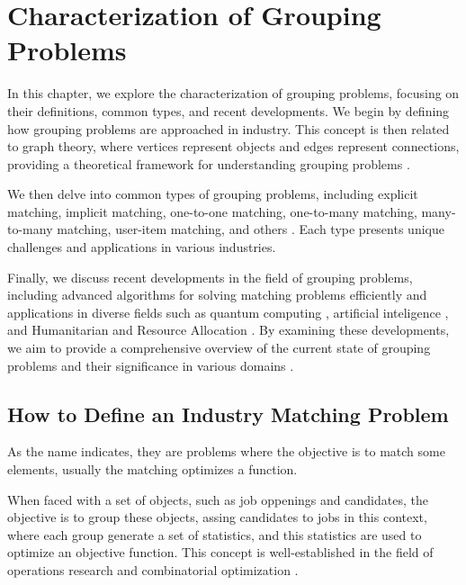 \chapter{Characterization of Grouping Problems} \label{chap:grouping_problems} 

    In this chapter, we explore the characterization of grouping problems, focusing on their definitions, common types, and recent developments. We begin by defining how grouping problems are approached in industry. This concept is then related to graph theory, where vertices represent objects and edges represent connections, providing a theoretical framework for understanding grouping problems \cite{newman2018networks}.
    
    We then delve into common types of grouping problems, including explicit matching, implicit matching, one-to-one matching, one-to-many matching, many-to-many matching, user-item matching, and others \cite{gusfield1989stable, demange1986multi}. Each type presents unique challenges and applications in various industries.
    
    Finally, we discuss recent developments in the field of grouping problems, including advanced algorithms for solving matching problems efficiently and applications in diverse fields such as quantum computing \cite{quantum_matching}, artificial inteligence \cite{gnn_graph_matching, cross_modal_matching}, and Humanitarian and Resource Allocation \cite{humanitarian_routing}. By examining these developments, we aim to provide a comprehensive overview of the current state of grouping problems and their significance in various domains \cite{ieee_survey}.
    
\section{How to Define an Industry Matching Problem}

    As the name indicates, they are problems where the objective is to match some elements, usually the matching optimizes a function.
    
    When faced with a set of objects, such as job oppenings and candidates, the objective is to group these objects, assing candidates to jobs in this context, where each group generate a set of statistics, and this statistics are used to optimize an objective function. This concept is well-established in the field of operations research and combinatorial optimization \cite{manlove2013algorithmics}.

